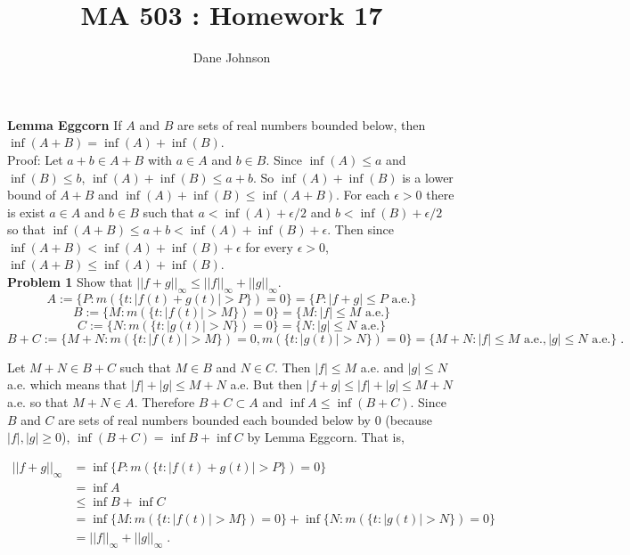 \documentclass[a4paper]{article}
\title{MA 503 : Homework 17}
\author{Dane Johnson}
\begin{document}
\maketitle

{\bf Lemma Eggcorn} If $A$ and $B$ are sets of real numbers bounded below, then $\inf(A+B)= \inf(A) + \inf(B)$. \\

Proof: Let $a+b \in A+B$ with $a \in A$ and $b \in B$. Since $\inf(A) \leq a$ and $\inf(B) \leq b$, $\inf(A) + \inf(B) \leq a+b$. So $\inf(A) + \inf(B)$ is a lower bound of $A+B$ and $\inf(A) + \inf(B) \leq \inf(A+B)$. For each $\epsilon > 0$ there is exist $a \in A$ and $b \in B$ such that $a< \inf(A) + \epsilon / 2$ and $b < \inf(B) + \epsilon /2$ so that $\inf(A+B) \leq a+b < \inf(A) + \inf(B) + \epsilon$. Then since $\inf(A+B) < \inf(A) +\inf(B) + \epsilon$ for every $\epsilon > 0$, $\inf(A+B) \leq \inf(A) + \inf(B)$. \\


{\bf Problem 1} Show that $||f+g||_\infty \leq ||f||_\infty + ||g||_\infty$.\\


$$A := \{P : m(\{t: |f(t) + g(t)| > P\}) = 0\} = \{P : |f+g| \leq P \text{ a.e.} \}$$
$$B := \{M : m(\{t: |f(t)| > M\}) = 0\} = \{M : |f| \leq M \text{ a.e.} \}$$
$$C := \{N : m(\{t: |g(t)| > N\}) = 0\} = \{N : |g| \leq N \text{ a.e.} \}$$
$$B+C := \{M+N : m(\{t: |f(t)| > M\}) = 0, m(\{t: |g(t)| > N\}) = 0\} = \{M+N : |f| \leq M \text{ a.e.}, |g| \leq N \text{ a.e.} \}\;.$$

Let $M+N \in B+C$ such that $M \in B$ and $N \in C$. Then $|f| \leq M$ a.e. and $|g| \leq N$ a.e. which means that $|f| + |g| \leq M+N$ a.e. But then $|f+g| \leq |f| + |g| \leq M+N$ a.e. so that $M+N \in A$. Therefore $B+C \subset A$ and $\inf A \leq \inf (B+C)$. Since $B$ and $C$ are sets of real numbers bounded each bounded below by 0 (because $|f|, |g| \geq 0$), $\inf (B+C) = \inf B + \inf C$ by Lemma Eggcorn. That is,

\begin{align*}
||f + g||_\infty &= \inf \{P : m(\{t: |f(t) + g(t)| > P\}) = 0\} \\
&= \inf A\\
& \leq \inf B + \inf C\\
& = \inf \{M : m(\{t: |f(t)| > M\}) = 0\} + \inf \{N : m(\{t: |g(t)| > N\}) = 0\}\\
& = ||f||_\infty + ||g||_\infty \;.
\end{align*}
\end{document}

